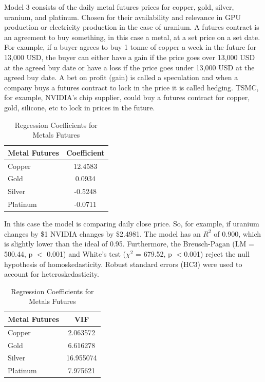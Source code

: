 \documentclass[12pt]{article}
\begin{document}
Model 3 consists of the daily metal futures prices for copper, gold, silver, uranium, and platinum. Chosen for their availability and relevance in GPU production or electricity production in the case of uranium. A futures contract is an agreement to buy something, in this case a metal, at a set price on a set date. For example, if a buyer agrees to buy 1 tonne of copper a week in the future for 13,000 USD, the buyer can either have a gain if the price goes over 13,000 USD at the agreed buy date or have a loss if the price goes under 13,000 USD at the agreed buy date. A bet on profit (gain) is called a speculation and when a company buys a futures contract to lock in the price it is called hedging. TSMC, for example, NVIDIA's chip supplier, could buy a futures contract for copper, gold, silicone, etc to lock in prices in the future. 

\begin{table}[h]
\centering
\begin{tabular}{lc}
\hline
\textbf{Metal Futures} & \textbf{Coefficient} \\
\hline
Copper & 12.4583 \\
Gold & 0.0934 \\
Silver  & -0.5248 \\
Platinum & -0.0711 \\
\hline
\end{tabular}
\caption{Regression Coefficients for Metals Futures}
\end{table}

\newpage

In this case the model is comparing daily close price. So, for example, if uranium changes by \$1 NVIDIA changes by \$2.4981. The model has an $R^2$ of 0.900, which is slightly lower than the ideal of 0.95. Furthermore, the Breusch-Pagan (LM = 500.44, p $<$ 0.001) and White's test ($\chi^2$ = 679.52, p $<$0.001) reject the null hypothesis of homoskedasticity. Robust standard errors (HC3) were used to account for heteroskedasticity. 

\begin{table}[h]
\centering
\begin{tabular}{lc}
\hline
\textbf{Metal Futures} & \textbf{VIF} \\
\hline
Copper & 2.063572 \\
Gold & 6.616278 \\
Silver  & 16.955074 \\
Platinum & 7.975621 \\
\hline
\end{tabular}
\caption{Regression Coefficients for Metals Futures}
\end{table}
\end{document}
